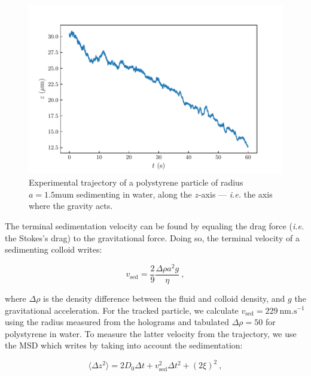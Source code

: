 \begin{figure}[H]
	\centering
	\includegraphics{02_body/chapter2/images/sedimenting/traj_sedimenting.pdf}
	\caption{Experimental trajectory of a polystyrene particle of radius $a = 1.5 \mathrm{mu m}$ sedimenting in water, along the $z$-axis --- \textit{i.e.} the axis where the gravity acts.}
	\label{fig:trajsed}
\end{figure}

The terminal sedimentation velocity can be found by equaling the drag force (\textit{i.e.} the Stokes's drag) to the gravitational force. Doing so, the terminal velocity of a sedimenting colloid writes:

\begin{equation}
	v_\mathrm{sed} = \frac{2}{9} \frac{\Delta \rho a^2 g}{\eta} ~,
	\label{vsed}
\end{equation}

where $\Delta \rho$ is the density difference between the fluid and colloid density, and $g$ the gravitational acceleration. For the tracked particle, we calculate $v_\mathrm{sed} = 229 ~\mathrm{nm.s^{-1}}$ using the radius measured from the holograms and tabulated $\Delta \rho = 50$ for polystyrene in water. To measure the latter velocity from the trajectory, we use the \gls{MSD} which writes by taking into account the sedimentation:

\begin{equation}
	\langle \Delta z ^2 \rangle = 2D_0 \Delta t + v_\mathrm{sed}^2 \Delta t^2 + (2\xi)^2 ~,
	\label{Eq.sedmsd}
\end{equation}

